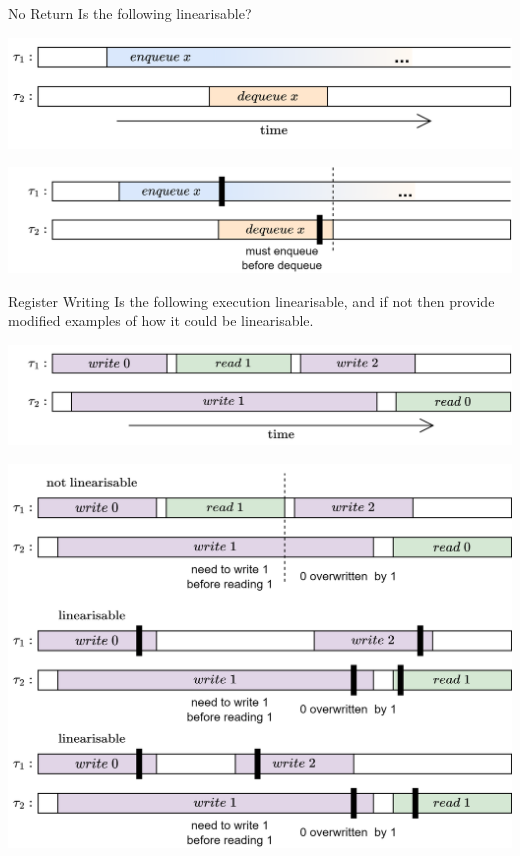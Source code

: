 \begin{examplebox}{No Return}
    Is the following linearisable?
    \begin{center}
        \includegraphics[width=.9\textwidth]{concurrent_objects/images/example_linearisation_no_return.drawio.png}
    \end{center}
    \tcblower
    \begin{center}
        \includegraphics[width=.9\textwidth]{concurrent_objects/images/example_linearisation_no_return_answer.drawio.png}
    \end{center}
\end{examplebox}

\begin{examplebox}{Register Writing}
    Is the following execution linearisable, and if not then provide modified examples of how it could be linearisable.
    \begin{center}
        \includegraphics[width=.9\textwidth]{concurrent_objects/images/example_registers_linearisable.drawio.png}
    \end{center}
    \tcblower
    \begin{center}
        \includegraphics[width=.9\textwidth]{concurrent_objects/images/example_registers_linearisable_answer.drawio.png}
    \end{center}
\end{examplebox}

